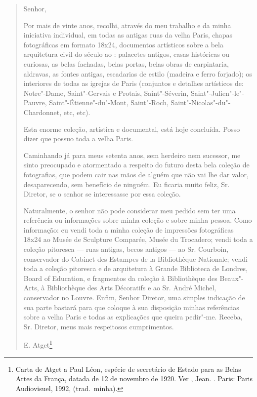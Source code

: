 \begin{quote}
Senhor,

Por mais de vinte anos, recolhi, através do meu trabalho e da minha
iniciativa individual, em todas as antigas ruas da velha Paris, chapas
fotográficas em formato 18x24, documentos artísticos sobre a bela
arquitetura civil do século  ao : palacetes antigos, casas
históricas ou curiosas, as belas fachadas, belas portas, belas obras de
carpintaria, aldravas, as fontes antigas, escadarias de estilo (madeira
e ferro forjado); os interiores de todas as igrejas de Paris (conjuntos
e detalhes artísticos de: Notre"-Dame, Saint"-Gervais e Protais,
Saint"-Séverin, Saint"-Julien"-le"-Pauvre, Saint"-Étienne"-du"-Mont,
Saint"-Roch, Saint"-Nicolas"-du"-Chardonnet, etc, etc).

Esta enorme coleção, artística e documental, está hoje concluída. Posso
dizer que possuo toda a velha Paris.

Caminhando já para meus setenta anos, sem herdeiro nem sucessor, me
sinto preocupado e atormentado a respeito do futuro desta bela coleção
de fotografias, que podem cair nas mãos de alguém que não vai lhe dar
valor, desaparecendo, sem benefício de ninguém. Eu ficaria muito feliz,
Sr. Diretor, se o senhor se interessasse por essa coleção.

Naturalmente, o senhor não pode considerar meu pedido sem ter uma
referência ou informações sobre minha coleção e sobre minha pessoa. Como
informação: eu vendi toda a minha coleção de impressões fotográficas 18x24 ao Musée de Sculpture Comparée, Musée du Trocadero; vendi toda a
coleção pitoresca --- ruas antigas, becos antigos --- ao Sr. Courboin,
conservador do Cabinet des Estampes de la Bibliothèque Nationale; vendi
toda a coleção pitoresca e de arquitetura à Grande Biblioteca de
Londres, Board of Education, e fragmentos da coleção à Bibliothèque des
Beaux"-Arts, à Bibliothèque des Arts Décoratifs e ao Sr. André Michel,
conservador no Louvre. Enfim, Senhor Diretor, uma simples indicação de
sua parte bastará para que coloque à sua disposição minhas referências
sobre a velha Paris e todas as explicações que queira pedir"-me. Receba,
Sr. Diretor, meus mais respeitosos cumprimentos.

\hfill{}E. Atget\footnote{Carta de Atget a Paul Léon, espécie de secretário de
  Estado para as Belas Artes da França, datada de 12 de novembro de
  1920. Ver , Jean. {}. Paris: Paris Audiovisuel, 1992, (trad.~minha).}
\end{quote}

